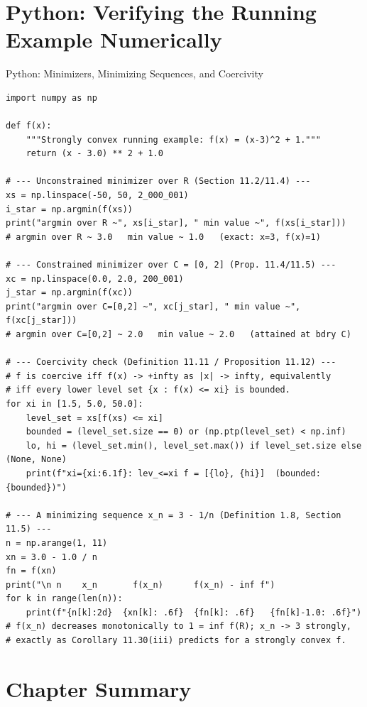 \documentclass[aspectratio=169,10pt]{beamer}
\begin{document}
\section{Python: Verifying the Running Example Numerically}

\begin{frame}[fragile]{Python: Minimizers, Minimizing Sequences, and Coercivity}
\begin{lstlisting}[caption={Numeric check of the running example $f(x)=(x-3)^2+1$}]
import numpy as np

def f(x):
    """Strongly convex running example: f(x) = (x-3)^2 + 1."""
    return (x - 3.0) ** 2 + 1.0

# --- Unconstrained minimizer over R (Section 11.2/11.4) ---
xs = np.linspace(-50, 50, 2_000_001)
i_star = np.argmin(f(xs))
print("argmin over R ~", xs[i_star], " min value ~", f(xs[i_star]))
# argmin over R ~ 3.0   min value ~ 1.0   (exact: x=3, f(x)=1)

# --- Constrained minimizer over C = [0, 2] (Prop. 11.4/11.5) ---
xc = np.linspace(0.0, 2.0, 200_001)
j_star = np.argmin(f(xc))
print("argmin over C=[0,2] ~", xc[j_star], " min value ~", f(xc[j_star]))
# argmin over C=[0,2] ~ 2.0   min value ~ 2.0   (attained at bdry C)

# --- Coercivity check (Definition 11.11 / Proposition 11.12) ---
# f is coercive iff f(x) -> +infty as |x| -> infty, equivalently
# iff every lower level set {x : f(x) <= xi} is bounded.
for xi in [1.5, 5.0, 50.0]:
    level_set = xs[f(xs) <= xi]
    bounded = (level_set.size == 0) or (np.ptp(level_set) < np.inf)
    lo, hi = (level_set.min(), level_set.max()) if level_set.size else (None, None)
    print(f"xi={xi:6.1f}: lev_<=xi f = [{lo}, {hi}]  (bounded: {bounded})")

# --- A minimizing sequence x_n = 3 - 1/n (Definition 1.8, Section 11.5) ---
n = np.arange(1, 11)
xn = 3.0 - 1.0 / n
fn = f(xn)
print("\n n    x_n       f(x_n)      f(x_n) - inf f")
for k in range(len(n)):
    print(f"{n[k]:2d}  {xn[k]: .6f}  {fn[k]: .6f}   {fn[k]-1.0: .6f}")
# f(x_n) decreases monotonically to 1 = inf f(R); x_n -> 3 strongly,
# exactly as Corollary 11.30(iii) predicts for a strongly convex f.
\end{lstlisting}
\end{frame}

\section{Chapter Summary}
\end{document}
